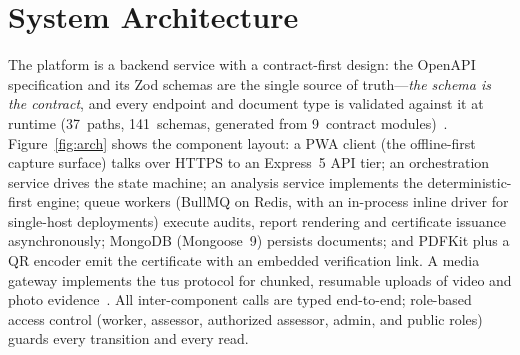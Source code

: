 \documentclass[conference]{IEEEtran}
\begin{document}
\section{System Architecture}
The platform is a backend service with a contract-first design: the OpenAPI specification
and its Zod schemas are the single source of truth---\emph{the schema is the contract}, and
every endpoint and document type is validated against it at runtime
(37~paths, 141~schemas, generated from 9~contract modules)~\cite{openapi}. Figure~\ref{fig:arch}
shows the component layout: a PWA client (the offline-first capture surface) talks over
HTTPS to an Express~5 API tier; an orchestration service drives the state machine; an
analysis service implements the deterministic-first engine; queue workers (BullMQ on Redis,
with an in-process {inline} driver for single-host deployments) execute audits, report
rendering and certificate issuance asynchronously; MongoDB (Mongoose~9) persists documents;
and PDFKit plus a QR encoder emit the certificate with an embedded verification link.
A media gateway implements the tus protocol for chunked, resumable uploads of video and
photo evidence~\cite{tus}. All inter-component calls are typed end-to-end; role-based access
control (worker, assessor, authorized assessor, admin, and public roles) guards every
transition and every read.
\end{document}
